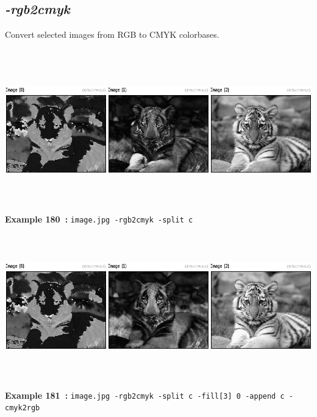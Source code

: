 \documentclass[a4paper,11pt,twoside]{book}
\begin{document}
\subsection{\emph{-rgb2cmyk} }\vspace*{-0.5em}
Convert selected images from RGB to CMYK colorbases.
\begin{center}\includegraphics[keepaspectratio=true,height=7cm,width=\textwidth]{img/gmic_def180.jpg}\\
{\footnotesize \textbf{Example 180~:} \texttt{image.jpg -rgb2cmyk -split c}}
\\\includegraphics[keepaspectratio=true,height=7cm,width=\textwidth]{img/gmic_def181.jpg}\\
{\footnotesize \textbf{Example 181~:} \texttt{image.jpg -rgb2cmyk -split c -fill[3] 0 -append c -cmyk2rgb}}
\end{center}
\end{document}
